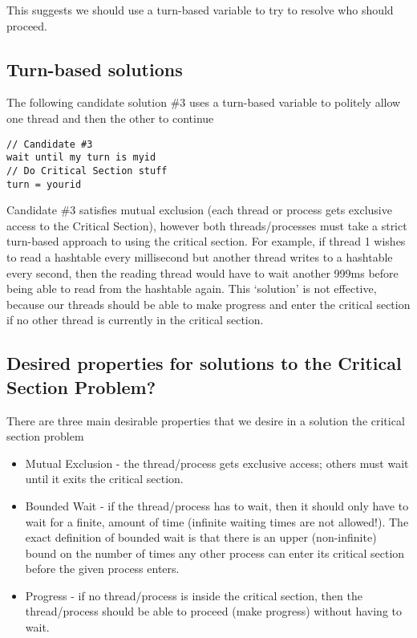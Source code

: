 This suggests we should use a turn-based variable to try to resolve who
should proceed.

\subsection{Turn-based solutions}\label{turn-based-solutions}

The following candidate solution \#3 uses a turn-based variable to
politely allow one thread and then the other to continue

\begin{verbatim}
// Candidate #3
wait until my turn is myid
// Do Critical Section stuff
turn = yourid
\end{verbatim}

Candidate \#3 satisfies mutual exclusion (each thread or process gets
exclusive access to the Critical Section), however both
threads/processes must take a strict turn-based approach to using the
critical section. For example, if thread 1 wishes to read a hashtable
every millisecond but another thread writes to a hashtable every second,
then the reading thread would have to wait another 999ms before being
able to read from the hashtable again. This `solution' is not effective,
because our threads should be able to make progress and enter the
critical section if no other thread is currently in the critical
section.

\subsection{Desired properties for solutions to the Critical Section
Problem?}\label{desired-properties-for-solutions-to-the-critical-section-problem}

There are three main desirable properties that we desire in a solution
the critical section problem

\begin{itemize}
\itemsep1pt\parskip0pt
\item
  Mutual Exclusion - the thread/process gets exclusive access; others
  must wait until it exits the critical section.
\item
  Bounded Wait - if the thread/process has to wait, then it should only
  have to wait for a finite, amount of time (infinite waiting times are
  not allowed!). The exact definition of bounded wait is that there is
  an upper (non-infinite) bound on the number of times any other process
  can enter its critical section before the given process enters.
\item
  Progress - if no thread/process is inside the critical section, then
  the thread/process should be able to proceed (make progress) without
  having to wait.
\end{itemize}

